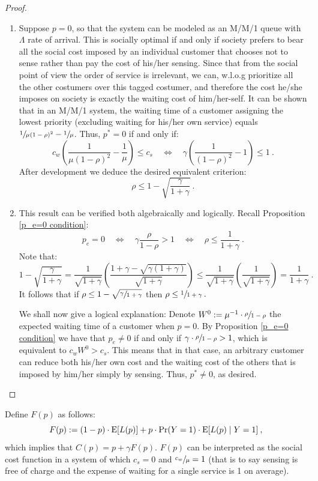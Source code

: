 \documentclass[11pt]{article}
\numberwithin{equation}{section}
\newcommand{\e}{{\rm E}}
\begin{document}
\begin{proof}
\begin{enumerate}[label=(\alph*)]
\item Suppose $p=0$, so that the system can be modeled as an M/M/1 queue with $\Lambda$ rate of arrival. This is socially optimal if and only if society prefers to bear all the social cost imposed by an individual customer that chooses not to sense rather than pay the cost of his/her sensing. Since that from the social point of view the order of service is irrelevant, we can, w.l.o.g prioritize all the other costumers over this tagged costumer, and therefore the cost he/she imposes on society is exactly the waiting cost of him/her-self. It can be shown that in an M/M/1 system, the waiting time of a customer assigning the lowest priority (excluding waiting for his/her own service) equals $ \sfrac{1}{\mu(1-\rho)^2}-\sfrac{1}{\mu}$. Thus, $p^*=0$ if and only if:
\[ c_w \left(\frac{1}{\mu(1-\rho)^2} - \frac{1}{\mu} \right) \leq c_s \quad \Leftrightarrow \quad \gamma \left(\frac{1}{(1-\rho)^2} - 1 \right) \leq 1\:. \]
After development we deduce the desired equivalent criterion:
\[ \rho \leq 1- \sqrt{\frac{\gamma}{1+\gamma}} \:.\]
\item This result can be verified both algebraically and logically. Recall Proposition \ref{p_e=0 condition}: 
\[p_e=0 \quad \Leftrightarrow \quad \gamma \frac{\rho}{1-\rho} > 1 \quad \Leftrightarrow \quad \rho \leq \frac{1}{1+\gamma} \:.\]
Note that:
\[ 1- \sqrt{\frac{\gamma}{1+\gamma}} = \frac{1}{\sqrt{1+\gamma}}\left( \frac{1+\gamma-\sqrt{\gamma(1+\gamma)}}{\sqrt{1+\gamma}} \right) \leq \frac{1}{\sqrt{1+\gamma}}\left( \frac{1}{\sqrt{1+\gamma}} \right) = \frac{1}{1+\gamma} \:.\]
It follows that if $\rho \leq 1- \sqrt{\sfrac{\gamma}{1+\gamma}}$ then $\rho \leq \sfrac{1}{1+\gamma} \:.$

We shall now give a logical explanation: Denote $W^0 := \mu^{-1} \cdot\sfrac{\rho}{1-\rho}$ the expected waiting time of a customer when $p=0$. By Proposition \ref{p_e=0 condition} we have that $p_e\neq0$ if and only if $\gamma \cdot \sfrac{\rho}{1-\rho} > 1$, which is equivalent to $c_w W^0 > c_s$.  This means that in that case, an arbitrary customer can reduce both his/her own cost and the waiting cost of the others that is imposed by him/her simply by sensing. Thus, $p^* \neq 0$, as desired.
\end{enumerate}
\end{proof}

Define $F(p)$ as follows:
\[ F(p) :=  (1-p) \cdot\e[L(p)] + p \cdot \Pr(Y=1) \cdot \e[L(p) \mid Y=1] \:,\]
which implies that $C(p)=p + \gamma F(p)$. $F(p)$ can be interpreted as the social cost function in a system of which $c_s=0$ and $\sfrac{c_w}{\mu}=1$ (that is to say sensing is free of charge and the expense of waiting for a single service is 1 on average).
\end{document}

